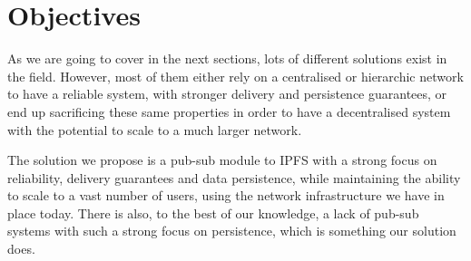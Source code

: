 
%
%

\section{Objectives}

As we are going to cover in the next sections, lots of different
solutions exist in the field. However, most of them either rely on a
centralised or hierarchic network to have a reliable system, with
stronger delivery and persistence guarantees, or end up sacrificing
these same properties in order to have a decentralised system with the
potential to scale to a much larger network.

The solution we propose is a pub-sub module to IPFS with a strong focus
on reliability, delivery guarantees and data persistence, while
maintaining the ability to scale to a vast number of users, using the
network infrastructure we have in place today. There is also, to the
best of our knowledge, a lack of pub-sub systems with such a strong
focus on persistence, which is something our solution does.
